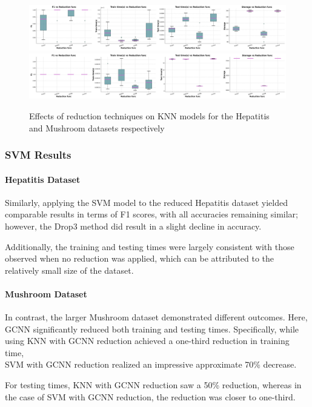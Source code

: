 \begin{figure}
    \centering
    \includegraphics[width=\textwidth]{figures/KNN_reduction_effects_hepatitis.png}
    \includegraphics[width=\textwidth]{figures/KNN_reduction_effects_mushroom.png}
    \caption{Effects of reduction techniques on KNN models for the Hepatitis and Mushroom datasets respectively}
    \label{fig:KNN-reduction-effects}
\end{figure}

\subsubsection{SVM Results}

\paragraph{Hepatitis Dataset} Similarly, applying the SVM model to the reduced Hepatitis dataset yielded comparable results in terms of F1 scores,
with all accuracies remaining similar; however, the Drop3 method did result in a slight decline in accuracy.

Additionally, the training and testing times were largely consistent with those observed when no reduction was applied,
which can be attributed to the relatively small size of the dataset.

\paragraph{Mushroom Dataset} In contrast, the larger Mushroom dataset demonstrated different outcomes.
Here, GCNN significantly reduced both training and testing times. 
Specifically, while using KNN with GCNN reduction achieved a one-third reduction in training time,\\
SVM with GCNN reduction realized an impressive approximate 70\% decrease. 

For testing times, KNN with GCNN reduction saw a 50\% reduction, whereas in the case of SVM with GCNN reduction, the reduction was closer to one-third.


